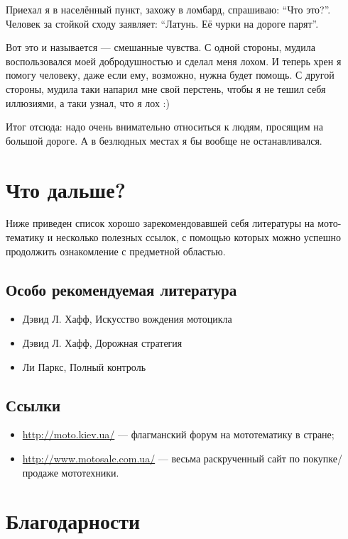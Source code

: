 \documentclass[12pt,a4paper]{article}
\begin{document}
Приехал я в населённый пункт, захожу в ломбард, спрашиваю: ``Что это?''.
Человек за стойкой сходу заявляет: ``Латунь. Её чурки на дороге парят''.

Вот это и называется --- смешанные чувства. С одной стороны, мудила
воспользовался моей добродушностью и сделал меня лохом. И теперь хрен
я помогу человеку, даже если ему, возможно, нужна будет помощь. С другой
стороны, мудила таки напарил мне свой перстень, чтобы я не тешил себя
иллюзиями, а таки узнал, что я лох :)

Итог отсюда: надо очень внимательно относиться к людям, просящим на
большой дороге. А в безлюдных местах я бы вообще не останавливался.

\clearpage

\section{Что дальше?}

Ниже приведен список хорошо зарекомендовавшей себя литературы на
мото-тематику и несколько полезных ссылок, с помощью которых можно
успешно продолжить ознакомление с предметной областью.

\subsection{Особо рекомендуемая литература}

\begin{itemize}
\item Дэвид Л. Хафф, Искусство вождения мотоцикла
\item Дэвид Л. Хафф, Дорожная стратегия
\item Ли Паркс, Полный контроль
\end{itemize}

\subsection{Ссылки}

\begin{itemize}
\item \url{http://moto.kiev.ua/} --- флагманский форум на мототематику в стране;
\item \url{http://www.motosale.com.ua/} --- весьма раскрученный сайт по покупке/продаже мототехники.
\end{itemize}

\clearpage

\section{Благодарности}
\end{document}

